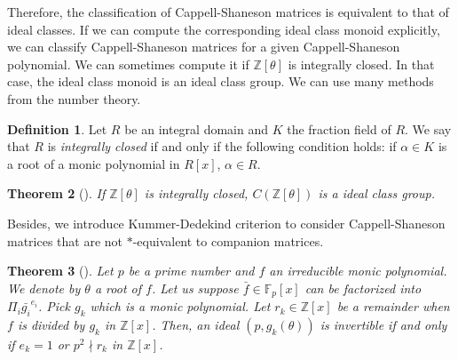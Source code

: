 \documentclass[12pt]{amsart}
\theoremstyle{plain}
\newtheorem{theorem}{Theorem}[section]
\theoremstyle{definition}
\newtheorem{definition}[theorem]{Definition}
\theoremstyle{remark}
\renewcommand{\(}{\big(}
\renewcommand{\)}{\big)}
\theoremstyle{plain}
\theoremstyle{definition}
\begin{document}
    Therefore, the classification of Cappell-Shaneson matrices is equivalent to that of ideal classes. If we can compute the corresponding ideal class monoid explicitly, we can classify Cappell-Shaneson matrices for a given Cappell-Shaneson polynomial. We can sometimes compute it if $\mathbb{Z}[\theta]$ is integrally closed. In that case, the ideal class monoid is an ideal class group. We can use many methods from the number theory. 
    \begin{definition}
    Let $R$ be an integral domain and $K$ the fraction field of $R$. We say that $R$ is \textit{integrally closed} if and only if the following condition holds: if $\alpha \in K$ is a root of a monic polynomial in $R[x]$, $\alpha \in R$.
    \end{definition}
    
    \begin{theorem}[{\cite[Theorem 4.4]{Kim-Yamada:2017-1}}]
    If $\mathbb{Z}[\theta]$ is integrally closed, $C(\mathbb{Z}[\theta])$ is a ideal class group. 
    \end{theorem}

    Besides, we introduce Kummer-Dedekind criterion to consider Cappell-Shaneson matrices that are not $*$-equivalent to companion matrices.
    \begin{theorem}[{\cite[Theorem 8.2]{Stevenhagen:2008-1}}]\label{theorem:kummerdedekind}
        Let $p$ be a prime number and $f$ an irreducible monic polynomial. We denote by $\theta$ a root of $f$. Let us suppose $\bar{f} \in \mathbb{F}_p[x]$ can be factorized into $\Pi_i \bar{g_i}^{e_i}$. Pick $g_k$ which is a monic polynomial. Let $r_k \in \mathbb{Z}[x]$ be a remainder when $f$ is divided by $g_k$ in $\mathbb{Z}[x]$. Then, an ideal $(p, g_k(\theta))$ is invertible if and only if $e_k=1$ or $p^2 \nmid r_k$ in $\mathbb{Z}[x]$.
    \end{theorem}
\end{document}
